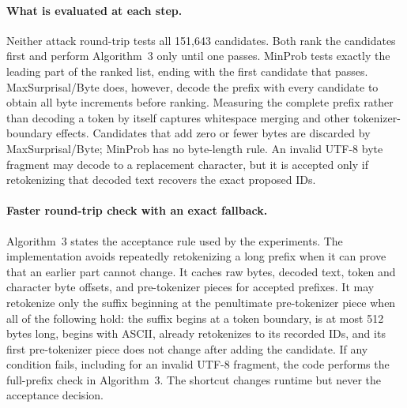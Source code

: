 \paragraph{What is evaluated at each step.}
Neither attack round-trip tests all 151,643 candidates. Both rank the candidates
first and perform Algorithm~3 only until one passes. MinProb tests exactly the leading part of the ranked list, ending with the
first candidate that passes. MaxSurprisal/Byte does,
however, decode the prefix with every candidate to obtain all byte increments
before ranking. Measuring the complete prefix rather than decoding a token by
itself captures whitespace merging and other tokenizer-boundary effects.
Candidates that add zero or fewer bytes are discarded by MaxSurprisal/Byte;
MinProb has no byte-length rule. An invalid UTF-8 byte fragment may decode to a
replacement character, but it is accepted only if retokenizing that decoded
text recovers the exact proposed IDs.

\paragraph{Faster round-trip check with an exact fallback.}
Algorithm~3 states the acceptance rule used by the experiments. The
implementation avoids repeatedly retokenizing a long prefix when it can prove
that an earlier part cannot change. It caches raw bytes, decoded text, token and
character byte offsets, and pre-tokenizer pieces for accepted prefixes. It may
retokenize only the suffix beginning at the penultimate pre-tokenizer piece when
all of the following hold: the suffix begins at a token boundary, is at most
512 bytes long, begins with ASCII, already retokenizes to its recorded IDs, and
its first pre-tokenizer piece does not change after adding the candidate. If
any condition fails, including for an invalid UTF-8 fragment, the code performs
the full-prefix check in Algorithm~3. The shortcut changes runtime but never
the acceptance decision.

